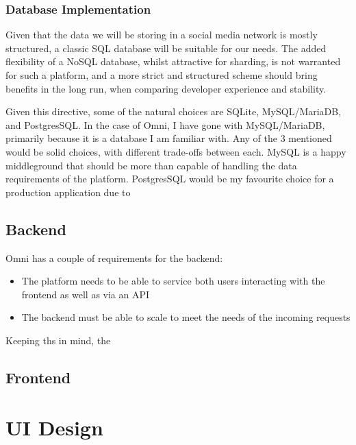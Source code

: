 \subsubsection{Database Implementation}
Given that the data we will be storing in a social media network is mostly structured, a classic SQL database will be suitable for our needs. The added flexibility of a NoSQL database, whilst attractive for sharding, is not warranted for such a platform, and a more strict and structured scheme should bring benefits in the long run, when comparing developer experience and stability. %

Given this directive, some of the natural choices are SQLite, MySQL/MariaDB, and PostgresSQL. In the case of Omni, I have gone with MySQL/MariaDB, primarily because it is a database I am familiar with. Any of the 3 mentioned would be solid choices, with different trade-offs between each. MySQL is a happy middleground that should be more than capable of handling the data requirements of the platform.
PostgresSQL would be my favourite choice for a production application due to %



\subsection{Backend}
\label{sec:design-system-backend}
Omni has a couple of requirements for the backend:
\begin{itemize}
    \item The platform needs to be able to service both users interacting with the frontend as well as via an API
    \item The backend must be able to scale to meet the needs of the incoming requests
\end{itemize}
Keeping ths in mind, the 

\subsection{Frontend}
\label{sec:design-system-frontend}

\section{UI Design}
\label{sec:design-ui}
